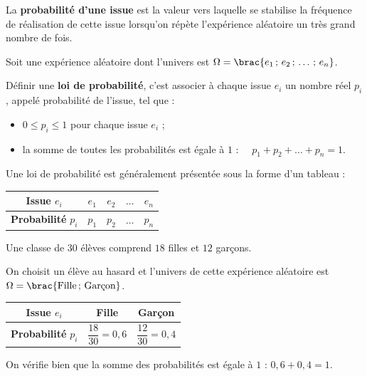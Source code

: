 \begin{defin}
	La \textbf{probabilité d'une issue} est la valeur vers laquelle se stabilise la fréquence de réalisation de cette issue lorsqu'on répète l'expérience aléatoire un très grand nombre de fois.

	Soit une expérience aléatoire dont l'univers est $\Omega = \brac{e_1\,;\,e_2\,;\,\dots\,;\,e_n}$.

	Définir une \textbf{loi de probabilité}, c'est associer à chaque issue $e_i$ un nombre réel $p_i$, appelé probabilité de l'issue, tel que :

	\begin{itemize}
		\item $0 \leq p_i \leq 1$ pour chaque issue $e_i$ ;
		\item la somme de toutes les probabilités est égale à $1$ : $\quad p_1 + p_2 + \dots + p_n = 1$.
	\end{itemize}
\end{defin}

\begin{rem}
	Une loi de probabilité est généralement présentée sous la forme d'un tableau :

	\begin{center}
		\begin{tabular}{|c|c|c|c|c|} \hline
			\ccg\textbf{Issue} $e_i$       & $e_1$ & $e_2$ & $\dots$ & $e_n$ \\ \hline
			\ccg\textbf{Probabilité} $p_i$ & $p_1$ & $p_2$ & $\dots$ & $p_n$ \\ \hline
		\end{tabular}
	\end{center}
\end{rem}

\begin{ex}
	Une classe de $30$ élèves comprend $18$ filles et $12$ garçons.

	On choisit un élève au hasard et l'univers de cette expérience aléatoire est $\Omega = \brac{\text{Fille}\,;\,\text{Garçon}}$.

	\begin{center}
		\begin{tabular}{|c|c|c|} \hline
			\ccg\textbf{Issue} $e_i$                             & Fille                    & Garçon                   \\ \hline
			\ccg\rule[-4mm]{0mm}{11mm}\textbf{Probabilité} $p_i$ & $\dfrac{18}{30} = 0{,}6$ & $\dfrac{12}{30} = 0{,}4$ \\ \hline
		\end{tabular}
	\end{center}

	On vérifie bien que la somme des probabilités est égale à $1$ : $0{,}6 + 0{,}4 = 1$.
\end{ex}

